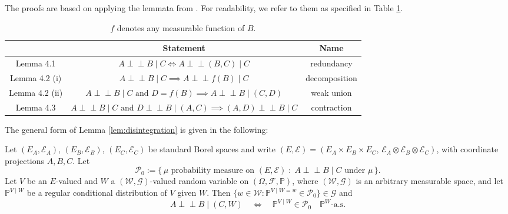 \documentclass[twoside,11pt]{article}
\newcommand{\indep}{\perp \!\!\! \perp}
\begin{document}
The proofs are based on applying the lemmata from \citet{dawid1979conditional}. For readability, we refer to them as specified in Table \ref{tab:dawid_ci_statements}. 
\begin{table}[t!]
    \centering
    \begin{tabular}{c|c|c}
    \citet{dawid1979conditional} & Statement & Name \\
    \hline
       Lemma 4.1 & $A\indep B\mid C\iff A\indep (B,C)\mid C$ & redundancy \\
       Lemma 4.2 (i) & $A\indep B\mid C\implies A\indep f(B)\mid C$ & decomposition\\
       Lemma 4.2 (ii) & $A\indep B\mid C \text{ and } D=f(B)\implies A\indep B\mid (C,D)$ & weak union \\
       Lemma 4.3 & $A\indep B\mid C \text{ and } D\indep B\mid (A,C)\implies (A,D)\indep B\mid C$ & contraction
    \end{tabular}
    \caption{ $f$ denotes any measurable function of $B$.}
    \label{tab:dawid_ci_statements}
\end{table}

The general form of Lemma \ref{lem:disintegration} is given in the following:
\begin{lemma}
\label{lem:disintegration-general}
Let $(E_A,\mathcal{E}_A)$, $(E_B,\mathcal{E}_B)$, $(E_C,\mathcal{E}_C)$ be
standard Borel spaces and write
$(E,\mathcal{E}) = (E_A\times E_B\times E_C,\,
\mathcal{E}_A\otimes\mathcal{E}_B\otimes\mathcal{E}_C)$, with coordinate
projections $A,B,C$. Let
\[
  \mathcal{P}_0 := \bigl\{\,\mu \text{ probability measure on }(E,\mathcal{E})
  \;:\; A \indep B \mid C \text{ under } \mu \,\bigr\}.
\]
Let $V$ be an $E$-valued and $W$ a $(\mathcal{W},\mathcal{G})$-valued random
variable on $(\Omega,\mathcal{F},\mathbb{P})$, where $(\mathcal{W},\mathcal{G})$
is an arbitrary measurable space, and let $\mathbb{P}^{V\mid W}$ be a regular
conditional distribution of $V$ given $W$. Then
$\{w\in\mathcal{W}:\mathbb{P}^{V\mid W=w}\in\mathcal{P}_0\}\in\mathcal{G}$ and
\[
  A \indep B \mid (C,W)
  \quad\Longleftrightarrow\quad
  \mathbb{P}^{V\mid W}\in\mathcal{P}_0 \quad \mathbb{P}^{W}\text{-a.s.}
\]
\end{lemma}
\end{document}

